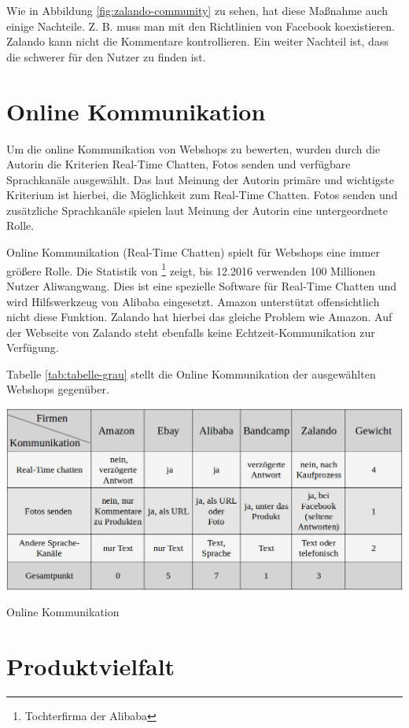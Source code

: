 Wie in Abbildung \vref{fig:zalando-community} zu sehen, hat diese Maßnahme auch einige Nachteile. Z. B. muss man mit den Richtlinien von Facebook koexistieren. Zalando kann nicht die Kommentare kontrollieren. Ein weiter Nachteil ist, dass die schwerer für den Nutzer zu finden ist.


\section{Online Kommunikation}

Um die online Kommunikation von Webshops zu bewerten, wurden durch die Autorin die Kriterien Real-Time Chatten, Fotos senden und verfügbare Sprachkanäle ausgewählt. Das laut Meinung der Autorin primäre und wichtigste Kriterium ist hierbei, die Möglichkeit zum Real-Time Chatten. Fotos senden und zusätzliche Sprachkanäle spielen laut Meinung der Autorin eine untergeordnete Rolle.

Online Kommunikation (Real-Time Chatten) spielt für Webshops eine immer größere Rolle. Die Statistik von \textcite{aliyun}\footnote{Tochterfirma der Alibaba} zeigt, bis 12.2016 verwenden 100 Millionen Nutzer Aliwangwang. Dies ist eine spezielle Software für Real-Time Chatten und wird Hilfswerkzeug von Alibaba eingesetzt. Amazon unterstützt offensichtlich nicht diese Funktion. Zalando hat hierbei das gleiche Problem wie Amazon. Auf der Webseite von Zalando steht ebenfalls keine Echtzeit-Kommunikation zur Verfügung. \parencite{piatscheck}

Tabelle \vref{tab:tabelle-grau} stellt die Online Kommunikation der ausgewählten Webshops gegenüber.

\begin{table}[htbp]
	\centering
	\includegraphics[width=1\textwidth]{bilder/tabelle-grau.png}
	\caption{Online Kommunikation}
	\label{tab:tabelle-grau}
\end{table}


\section{Produktvielfalt}

